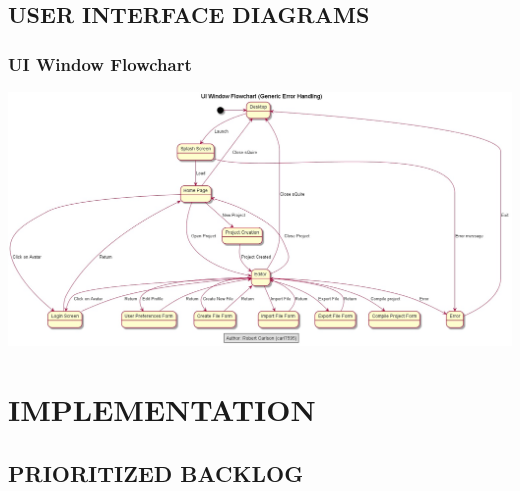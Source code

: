 \documentclass[twoside,letterpaper]{article}
\begin{document}
	\newpage





\subsection[USER INTERFACE DIAGRAMS]{\rmfamily\bfseries USER INTERFACE DIAGRAMS}
\subsubsection[UI Window Flowchart]{\rmfamily\bfseries\color{black}
	UI Window Flowchart}
\includegraphics[width=6.0in]{images/GUIDiagrams/sQuireUIWindowsFlowchart.jpg}
\newpage

\section[IMPLEMENTATION]{\rmfamily\bfseries\color{black} IMPLEMENTATION}

\subsection[PRIORITIZED BACKLOG]{\rmfamily\bfseries PRIORITIZED BACKLOG}
\end{document}
